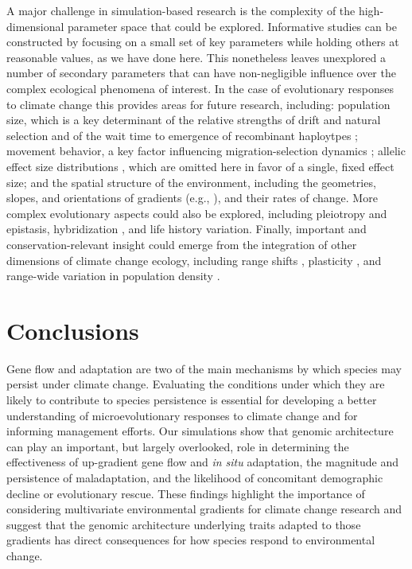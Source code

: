 \documentclass[9pt,twocolumn,twoside,lineno]{pnas-new}
\begin{document}
A major challenge in simulation-based research is the complexity of the high-dimensional 
parameter space that could be explored.
Informative studies can be constructed by focusing on a small set of
key parameters while holding others at reasonable values, as we have done here.
This nonetheless leaves unexplored a number of secondary parameters
that can have non-negligible influence over the complex ecological phenomena of interest.
In the case of evolutionary responses to climate change
this provides areas for future research, including:
population size, which is a key determinant of the relative strengths of drift
and natural selection \cite{murray} and of the wait time to emergence of
recombinant haploytpes \cite{christiansen};
movement behavior, a key factor influencing
migration-selection dynamics \cite{wright,haldane,barton};
allelic effect size distributions \cite{orr},
which are omitted here in favor of a single, fixed effect size;
and the spatial structure of the environment,
including the geometries, slopes, and orientations of gradients
(e.g., \cite{benes}), and their rates of change.
More complex evolutionary aspects could also be explored, including 
pleiotropy \cite{thompson} and epistasis,
hybridization \cite{turbek}, and life history variation.
Finally, important and conservation-relevant insight could emerge from the 
integration of other dimensions of climate change ecology, including range shifts 
\cite{weiss-lehman}, plasticity \cite{chevin},
and range-wide variation in population density \cite{aitken_whitlock}.

\section*{Conclusions}
Gene flow and adaptation are two of the main mechanisms by which species may persist under climate change. Evaluating the conditions under which they are likely to contribute to species persistence is essential for developing a better understanding 
of microevolutionary responses to climate change and for informing management efforts. Our simulations show that 
genomic architecture can play an important, but largely overlooked, role in determining the effectiveness
of up-gradient gene flow and \textit{in situ} adaptation,
the magnitude and persistence
of maladaptation,
and the likelihood of concomitant demographic decline
or evolutionary rescue. These findings highlight the importance of considering multivariate environmental gradients for climate change research and suggest that the genomic architecture underlying traits adapted to those gradients has direct consequences for how species respond to environmental change.
\end{document}
